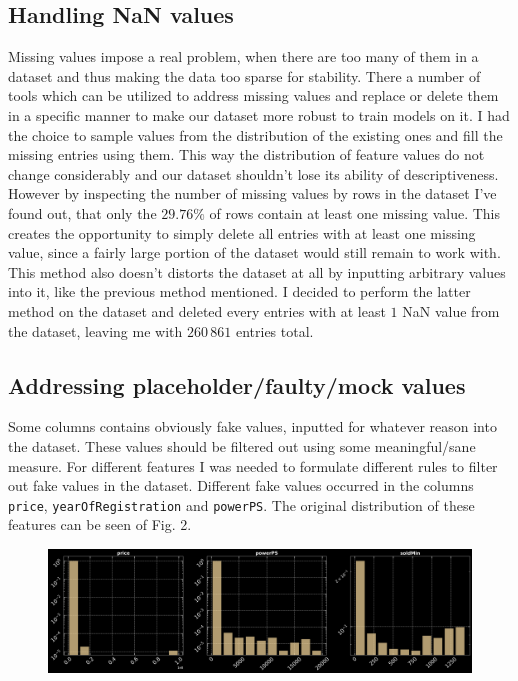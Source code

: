 \subsection{Handling NaN values}
Missing values impose a real problem, when there are too many of them in a dataset and thus making the data too sparse for stability. There a number of tools which can be utilized to address missing values and replace or delete them in a specific manner to make our dataset more robust to train models on it.
I had the choice to sample values from the distribution of the existing ones and fill the missing entries using them. This way the distribution of feature values do not change considerably and our dataset shouldn't lose its ability of descriptiveness.
However by inspecting the number of missing values by rows in the dataset I've found out, that only the $29.76\%$ of rows contain at least one missing value. This creates the opportunity to simply delete all entries with at least one missing value, since a fairly large portion of the dataset would still remain to work with. This method also doesn't distorts the dataset at all by inputting arbitrary values into it, like the previous method mentioned. I decided to perform the latter method on the dataset and deleted every entries with at least $1$ NaN value from the dataset, leaving me with $260\,861$ entries total.

\subsection{Addressing placeholder/faulty/mock values}
Some columns contains obviously fake values, inputted for whatever reason into the dataset. These values should be filtered out using some meaningful/sane measure. For different features I was needed to formulate different rules to filter out fake values in the dataset. Different fake values occurred in the columns \texttt{price}, \texttt{yearOfRegistration} and \texttt{powerPS}. The original distribution of these features can be seen of Fig. 2.

\begin{figure}[h]
	\begin{center}
		\includegraphics[width=\linewidth]{./images/fig_1_dist_pre.png}
	\end{center}
\end{figure}

